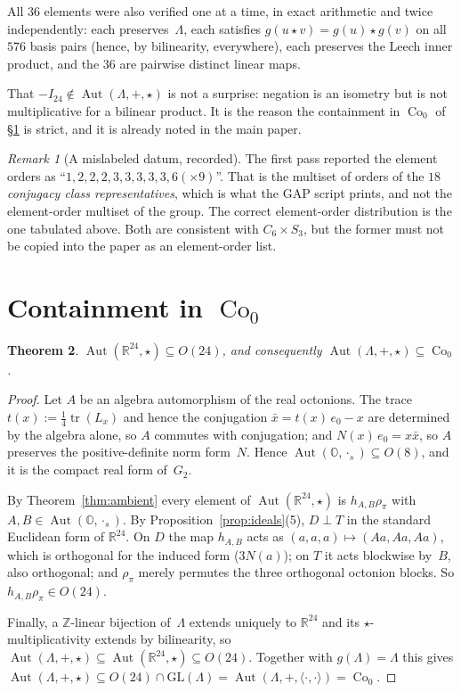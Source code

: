 \documentclass[11pt]{amsart}
\newcommand{\LL}{\Lambda}
\newcommand{\OO}{\mathbb{O}}
\newcommand{\ZZ}{\mathbb{Z}}
\newcommand{\RR}{\mathbb{R}}
\newcommand{\Nrm}{N}
\newcommand{\ip}[2]{\langle #1, #2 \rangle}
\DeclareMathOperator{\Aut}{Aut}
\DeclareMathOperator{\Co}{Co}
\DeclareMathOperator{\Tr}{tr}
\newtheorem{theorem}{Theorem}
\theoremstyle{definition}
\theoremstyle{remark}
\newtheorem{remark}[theorem]{Remark}
\begin{document}
All $36$ elements were also verified one at a time, in exact arithmetic and
twice independently: each preserves~$\LL$, each satisfies
$g(u \star v) = g(u) \star g(v)$ on all $576$ basis pairs (hence, by
bilinearity, everywhere), each preserves the Leech inner product, and the $36$
are pairwise distinct linear maps.

That $-I_{24} \notin \Aut(\LL,+,\star)$ is not a surprise: negation is an
isometry but is not multiplicative for a bilinear product. It is the reason the
containment in $\Co_0$ of \S\ref{sec:co0} is strict, and it is already noted in
the main paper.

\begin{remark}[A mislabeled datum, recorded]
The first pass reported the element orders as
``$1,2,2,2,3,3,3,3,3,6(\times 9)$''. That is the multiset of orders of the $18$
\emph{conjugacy class representatives}, which is what the GAP script prints, and
not the element-order multiset of the group. The correct element-order
distribution is the one tabulated above. Both are consistent with
$C_6 \times S_3$, but the former must not be copied into the paper as an
element-order list.
\end{remark}

\section{Containment in $\Co_0$}\label{sec:co0}

\begin{theorem}\label{thm:co0}
$\Aut(\RR^{24}, \star) \subseteq O(24)$, and consequently
$\Aut(\LL, +, \star) \subseteq \Co_0$.
\end{theorem}

\begin{proof}
Let $A$ be an algebra automorphism of the real octonions. The trace
$t(x) := \tfrac14 \Tr(L_x)$ and hence the conjugation
$\bar x = t(x)\,e_0 - x$ are determined by the algebra alone, so $A$ commutes
with conjugation; and $\Nrm(x)\,e_0 = x \bar x$, so $A$ preserves the
positive-definite norm form~$\Nrm$. Hence
$\Aut(\OO, \cdot_s) \subseteq O(8)$, and it is the compact real form
of~$G_2$.

By Theorem~\ref{thm:ambient} every element of $\Aut(\RR^{24}, \star)$ is
$h_{A,B}\rho_\pi$ with $A, B \in \Aut(\OO, \cdot_s)$. By
Proposition~\ref{prop:ideals}(5), $D \perp T$ in the standard Euclidean form
of $\RR^{24}$. On $D$ the map $h_{A,B}$ acts as $(a,a,a) \mapsto (Aa,Aa,Aa)$,
which is orthogonal for the induced form ($3\Nrm(a)$); on $T$ it acts
blockwise by~$B$, also orthogonal; and $\rho_\pi$ merely permutes the three
orthogonal octonion blocks. So $h_{A,B}\rho_\pi \in O(24)$.

Finally, a $\ZZ$-linear bijection of~$\LL$ extends uniquely to $\RR^{24}$ and
its $\star$-multiplicativity extends by bilinearity, so
$\Aut(\LL,+,\star) \subseteq \Aut(\RR^{24},\star) \subseteq O(24)$. Together
with $g(\LL) = \LL$ this gives
$\Aut(\LL,+,\star) \subseteq O(24) \cap \mathrm{GL}(\LL)
 = \Aut(\LL, +, \ip{\cdot}{\cdot}) = \Co_0$.
\end{proof}
\end{document}
